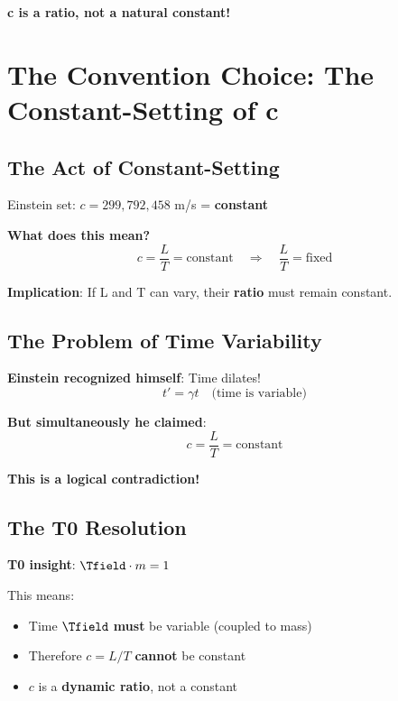 	\textbf{c is a ratio, not a natural constant!}
	
	\section{The Convention Choice: The Constant-Setting of c}
	
	\subsection{The Act of Constant-Setting}
	
	Einstein set: $c = 299,792,458$ m/s = \textbf{constant}
	
	\textbf{What does this mean?}
	\begin{equation}
		c = \frac{L}{T} = \text{constant} \quad \Rightarrow \quad \frac{L}{T} = \text{fixed}
	\end{equation}
	
	\textbf{Implication}: If L and T can vary, their \textbf{ratio} must remain constant.
	
	\subsection{The Problem of Time Variability}
	
	\textbf{Einstein recognized himself}: Time dilates!
	\begin{equation}
		t' = \gamma t \quad \text{(time is variable)}
	\end{equation}
	
	\textbf{But simultaneously he claimed}: 
	\begin{equation}
		c = \frac{L}{T} = \text{constant}
	\end{equation}
	
	\textbf{This is a logical contradiction!}
	
	\subsection{The T0 Resolution}
	
	\textbf{T0 insight}: $\Tfield \cdot m = 1$
	
	This means:
	\begin{itemize}
		\item Time $\Tfield$ \textbf{must} be variable (coupled to mass)
		\item Therefore $c = L/T$ \textbf{cannot} be constant
		\item $c$ is a \textbf{dynamic ratio}, not a constant
	\end{itemize}
	
